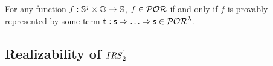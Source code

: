 {%
\begin{cor}
For any function $f: \mathbb{S}^j \times \mathbb{O} \rightarrow \mathbb{S}$,
$f\in \mathcal{POR}$ if and only if $f$ is provably represented
by some term $\tTerm :\sT \arrowT \dots \arrowT \sT
\in \PORo$.
\end{cor}















































































\subsection{Realizability of $I{\mathit{RS}^1_2}$}\label{sec:IPORo}

}

